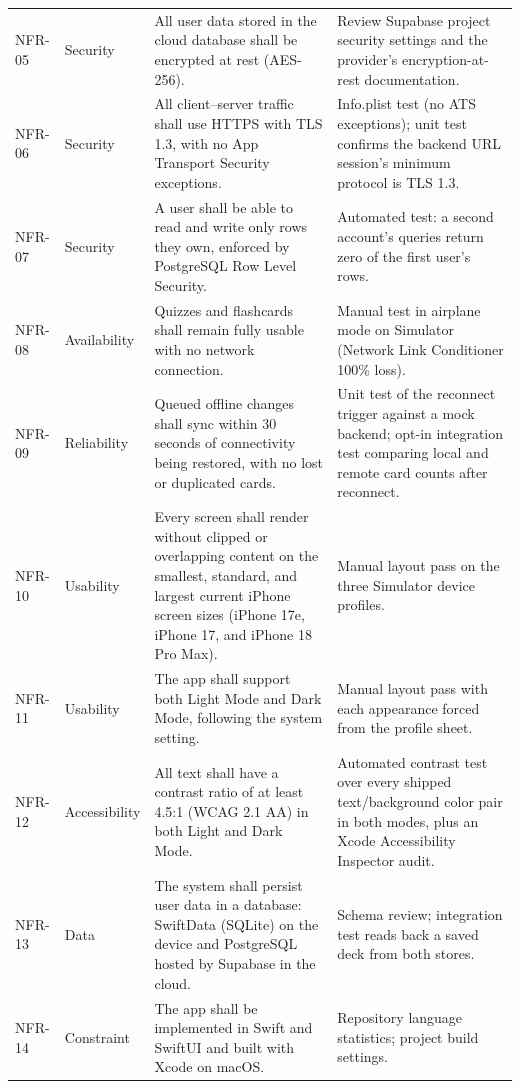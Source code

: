 \documentclass[12pt,letterpaper]{article}
\begin{document}
\begin{xltabular}{\textwidth}{@{}l L{2.1cm} Y L{4.3cm}@{}}
NFR-05 & Security & All user data stored in the cloud database shall be encrypted at rest (AES-256). & Review Supabase project security settings and the provider's encryption-at-rest documentation. \\
NFR-06 & Security & All client--server traffic shall use HTTPS with TLS 1.3, with no App Transport Security exceptions. & Info.plist test (no ATS exceptions); unit test confirms the backend URL session's minimum protocol is TLS 1.3. \\
NFR-07 & Security & A user shall be able to read and write only rows they own, enforced by PostgreSQL Row Level Security. & Automated test: a second account's queries return zero of the first user's rows. \\
NFR-08 & Availability & Quizzes and flashcards shall remain fully usable with no network connection. & Manual test in airplane mode on Simulator (Network Link Conditioner 100\% loss). \\
NFR-09 & Reliability & Queued offline changes shall sync within 30 seconds of connectivity being restored, with no lost or duplicated cards. & Unit test of the reconnect trigger against a mock backend; opt-in integration test comparing local and remote card counts after reconnect. \\
NFR-10 & Usability & Every screen shall render without clipped or overlapping content on the smallest, standard, and largest current iPhone screen sizes (iPhone 17e, iPhone 17, and iPhone 18 Pro Max). & Manual layout pass on the three Simulator device profiles. \\
NFR-11 & Usability & The app shall support both Light Mode and Dark Mode, following the system setting. & Manual layout pass with each appearance forced from the profile sheet. \\
NFR-12 & Accessibility & All text shall have a contrast ratio of at least 4.5:1 (WCAG 2.1 AA) in both Light and Dark Mode. & Automated contrast test over every shipped text/background color pair in both modes, plus an Xcode Accessibility Inspector audit. \\
NFR-13 & Data & The system shall persist user data in a database: SwiftData (SQLite) on the device and PostgreSQL hosted by Supabase in the cloud. & Schema review; integration test reads back a saved deck from both stores. \\
NFR-14 & Constraint & The app shall be implemented in Swift and SwiftUI and built with Xcode on macOS. & Repository language statistics; project build settings. \\

\end{xltabular}
\end{document}

